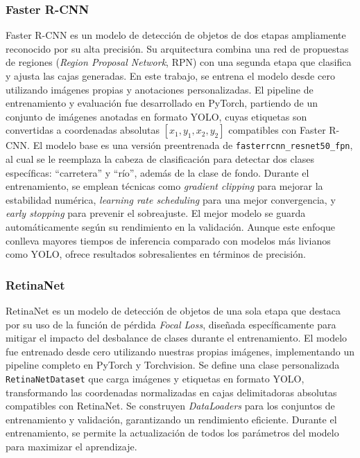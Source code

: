 \subsubsection{Faster R-CNN}  
Faster R-CNN es un modelo de detección de objetos de dos etapas ampliamente reconocido por su alta precisión. Su arquitectura combina una red de propuestas de regiones (\textit{Region Proposal Network}, RPN) con una segunda etapa que clasifica y ajusta las cajas generadas. En este trabajo, se entrena el modelo desde cero utilizando imágenes propias y anotaciones personalizadas. El pipeline de entrenamiento y evaluación fue desarrollado en PyTorch, partiendo de un conjunto de imágenes anotadas en formato YOLO, cuyas etiquetas son convertidas a coordenadas absolutas \([x_1, y_1, x_2, y_2]\) compatibles con Faster R-CNN. El modelo base es una versión preentrenada de \texttt{fasterrcnn\_resnet50\_fpn}, al cual se le reemplaza la cabeza de clasificación para detectar dos clases específicas: ``carretera'' y ``río'', además de la clase de fondo. Durante el entrenamiento, se emplean técnicas como \textit{gradient clipping} para mejorar la estabilidad numérica, \textit{learning rate scheduling} para una mejor convergencia, y \textit{early stopping} para prevenir el sobreajuste. El mejor modelo se guarda automáticamente según su rendimiento en la validación. Aunque este enfoque conlleva mayores tiempos de inferencia comparado con modelos más livianos como YOLO, ofrece resultados sobresalientes en términos de precisión.

\subsubsection{RetinaNet}  
RetinaNet es un modelo de detección de objetos de una sola etapa que destaca por su uso de la función de pérdida \textit{Focal Loss}, diseñada específicamente para mitigar el impacto del desbalance de clases durante el entrenamiento. El modelo fue entrenado desde cero utilizando nuestras propias imágenes, implementando un pipeline completo en PyTorch y Torchvision. Se define una clase personalizada \texttt{RetinaNetDataset} que carga imágenes y etiquetas en formato YOLO, transformando las coordenadas normalizadas en cajas delimitadoras absolutas compatibles con RetinaNet. Se construyen \textit{DataLoaders} para los conjuntos de entrenamiento y validación, garantizando un rendimiento eficiente. Durante el entrenamiento, se permite la actualización de todos los parámetros del modelo para maximizar el aprendizaje.


